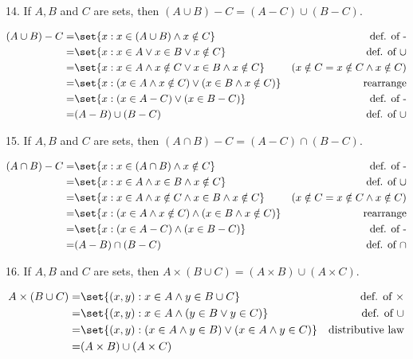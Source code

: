 \documentclass{hippoidC}
\begin{document}
\begin{prooflist}{14. If $A, B$ and $C$ are sets, then $(A \cup B)-C=(A-C) \cup(B-C)$.}
\item
\begin{align*}
    (A\cup B) - C =& \set{x: x\in (A\cup B) \land x\notin C} & \text{def. of -}\\
    =& \set{x: x\in A \lor x \in B \lor x\notin C} & \text{def. of $\cup$}\\
    =& \set{x: x\in A \land x\notin C \lor x\in B \land x\notin C} & (x\notin C = x\notin C \land x \notin C) \\
    =& \set{x: (x\in A \land x\notin C) \lor (x\in B \land x\notin C)} & \text{rearrange}\\
    =& \set{x: (x\in A  - C) \lor (x\in B - C)} & \text{def. of -}\\
    =& (A - B) \cup (B-C) & \text{def. of }\cup
\end{align*}
\end{prooflist}

\begin{prooflist}{15. If $A, B$ and $C$ are sets, then $(A \cap B)-C=(A-C) \cap(B-C)$.}
\item
\begin{align*}
    (A\cap B) - C =& \set{x: x\in (A\cap B) \land x\notin C} & \text{def. of -}\\
    =& \set{x: x\in A \land x \in B \land x\notin C} & \text{def. of $\cup$}\\
    =& \set{x: x\in A \land x\notin C \land x\in B \land x\notin C} & (x\notin C = x\notin C \land x \notin C) \\
    =& \set{x: (x\in A \land x\notin C) \land (x\in B \land x\notin C)} & \text{rearrange}\\
    =& \set{x: (x\in A  - C) \land (x\in B - C)} & \text{def. of -}\\
    =& (A - B) \cap (B-C) & \text{def. of }\cap
\end{align*}
\end{prooflist}

\begin{prooflist}{16. If $A, B$ and $C$ are sets, then $A \times(B \cup C)=(A \times B) \cup(A \times C)$.}
\item
\begin{align*}
    A\times (B\cup C) =& \set{(x, y): x\in A \land y\in B\cup C} & \text{def. of }\times\\
    =& \set{(x,y): x\in A \land (y \in B \lor y\in C)} & \text{def. of $\cup$}\\
    =& \set{(x,y): (x\in A \land y \in B) \lor (x\in A \land y\in C)} &
    \text{distributive law}\\
    =& (A\times B) \cup (A\times C)
\end{align*}
\end{prooflist}
\end{document}
